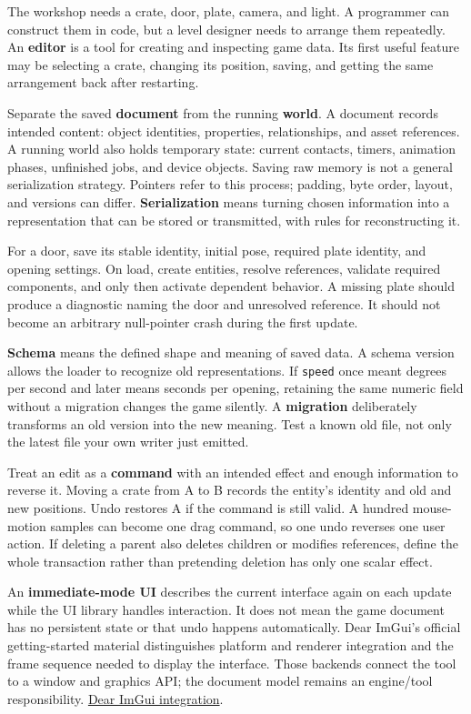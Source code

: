The workshop needs a crate, door, plate, camera, and light. A programmer can construct them in code, but a level designer needs to arrange them repeatedly. An \textbf{editor} is a tool for creating and inspecting game data. Its first useful feature may be selecting a crate, changing its position, saving, and getting the same arrangement back after restarting.

Separate the saved \textbf{document} from the running \textbf{world}. A document records intended content: object identities, properties, relationships, and asset references. A running world also holds temporary state: current contacts, timers, animation phases, unfinished jobs, and device objects. Saving raw memory is not a general serialization strategy. Pointers refer to this process; padding, byte order, layout, and versions can differ. \textbf{Serialization} means turning chosen information into a representation that can be stored or transmitted, with rules for reconstructing it.

For a door, save its stable identity, initial pose, required plate identity, and opening settings. On load, create entities, resolve references, validate required components, and only then activate dependent behavior. A missing plate should produce a diagnostic naming the door and unresolved reference. It should not become an arbitrary null-pointer crash during the first update.

\textbf{Schema} means the defined shape and meaning of saved data. A schema version allows the loader to recognize old representations. If \texttt{speed} once meant degrees per second and later means seconds per opening, retaining the same numeric field without a migration changes the game silently. A \textbf{migration} deliberately transforms an old version into the new meaning. Test a known old file, not only the latest file your own writer just emitted.

Treat an edit as a \textbf{command} with an intended effect and enough information to reverse it. Moving a crate from A to B records the entity's identity and old and new positions. Undo restores A if the command is still valid. A hundred mouse-motion samples can become one drag command, so one undo reverses one user action. If deleting a parent also deletes children or modifies references, define the whole transaction rather than pretending deletion has only one scalar effect.

An \textbf{immediate-mode UI} describes the current interface again on each update while the UI library handles interaction. It does not mean the game document has no persistent state or that undo happens automatically. Dear ImGui's official getting-started material distinguishes platform and renderer integration and the frame sequence needed to display the interface. Those backends connect the tool to a window and graphics API; the document model remains an engine/tool responsibility. \href{https://github.com/ocornut/imgui/wiki/Getting-Started}{Dear ImGui integration}.

